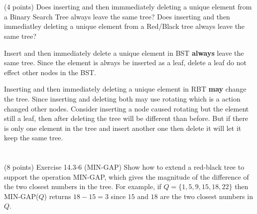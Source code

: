 \documentclass[paper=a4, fontsize=11pt]{scrartcl} %
\begin{document}
\maketitle %

\section{}

\begin{fancyquotes}
  (4 points) Does inserting and then immmediately deleting a unique
  element from a Binary Search Tree always leave the same tree? Does
  inserting and then immediatley deleting a unique element from a
  Red/Black tree always leave the same tree?
\end{fancyquotes}

Insert and then immediately delete a unique element in BST
\textbf{always} leave the same tree. Since the element is always be
inserted as a leaf, delete a leaf do not effect other nodes in the
BST.

Inserting and then immediately deleting a unique element in RBT
\textbf{may} change the tree. Since inserting and deleting both may
use rotating which is a action changed other nodes. Consider inserting
a node caused rotating but the element still a leaf, then after
deleting the tree will be different than before. But if there is only
one element in the tree and insert another one then delete it will let
it keep the same tree.


\section{}

\begin{fancyquotes}
  (8 points) Exercise 14.3-6 (MIN-GAP) Show how to extend a red-black
  tree to support the operation MIN-GAP, which gives the magnitude of
  the difference of the two closest numbers in the tree. For example,
  if $Q = \{1, 5, 9, 15, 18, 22\}$ then MIN-GAP($Q$) returns $18-15 = 3$
  since $15$ and $18$ are the two closest numbers in $Q$.
\end{fancyquotes}
\end{document}
